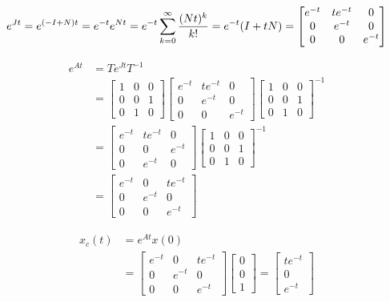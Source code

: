 \documentclass[12pt,a4paper]{article}
\begin{document}
\[
e^{Jt} = e^{(-I + N)t } = e^{-t} e^{Nt} = e^{-t} \sum_{k = 0}^{\infty} { (Nt)^k \over k! } = e^{-t} (I + tN) = \begin{bmatrix}
	e^{-t} & te^{-t} & 0 \\
	0 & e^{-t} & 0 \\
	0 & 0 & e^{-t}
\end{bmatrix}
\]

\begin{align*}
	e^{At} &= Te^{Jt}T^{-1} \\ 
	&= \begin{bmatrix}
		1 & 0 & 0 \\
		0 & 0 & 1 \\
		0 & 1 & 0
	\end{bmatrix}\begin{bmatrix}
	e^{-t} & te^{-t} & 0 \\
	0 & e^{-t} & 0 \\
	0 & 0 & e^{-t}
	\end{bmatrix} \begin{bmatrix}
	1 & 0 & 0 \\
	0 & 0 & 1 \\
	0 & 1 & 0
	\end{bmatrix}^{-1} \\ 
	&= \begin{bmatrix}
	e^{-t} & te^{-t} & 0 \\
	0 & 0 & e^{-t} \\
	0 & e^{-t} & 0
	\end{bmatrix}\begin{bmatrix}
	1 & 0 & 0 \\
	0 & 0 & 1 \\
	0 & 1 & 0
	\end{bmatrix}^{-1} \\
	&= \begin{bmatrix}
		e^{-t} & 0 & te^{-t} \\
		0 & e^{-t} & 0 \\
		0 & 0 & e^{-t}
	\end{bmatrix}
\end{align*}

\begin{align*}
	x_c(t) &= e^{At}x(0) \\
	&= \begin{bmatrix}
		e^{-t} & 0 & te^{-t} \\
		0 & e^{-t} & 0 \\
		0 & 0 & e^{-t}
	\end{bmatrix} \begin{bmatrix}
	0 \\ 0 \\ 1
	\end{bmatrix} = \begin{bmatrix}
	te^{-t} \\ 0 \\ e^{-t}
	\end{bmatrix}
\end{align*}
\end{document}
